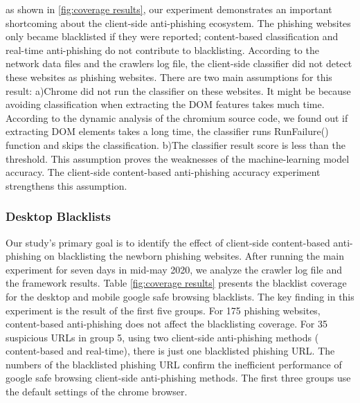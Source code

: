 as shown in \ref{fig:coverage results}, our experiment demonstrates an important shortcoming about the client-side anti-phishing ecosystem. The phishing websites only became blacklisted if they were reported; content-based classification and real-time anti-phishing do not contribute to blacklisting.
According to the network data files and the crawlers log file, the client-side classifier did not detect these websites as phishing websites. There are two main assumptions for this result:
a)Chrome did not run the classifier on these websites. It might be because avoiding classification when extracting the DOM features takes much time. According to the dynamic analysis of the chromium source code, we found out if extracting DOM elements takes a long time, the classifier runs RunFailure() function and skips the classification.
b)The classifier result score is less than the threshold. This assumption proves the weaknesses of the machine-learning model accuracy.  The client-side content-based anti-phishing accuracy experiment strengthens this assumption.

\subsubsection{Desktop Blacklists}
Our study's primary goal is to identify the effect of client-side content-based anti-phishing on blacklisting the newborn phishing websites. After running the main experiment for seven days in mid-may 2020, we analyze the crawler log file and the framework results. Table \ref{fig:coverage results} presents the blacklist coverage for the desktop and mobile google safe browsing blacklists. The key finding in this experiment is the result of the first five groups. For 175 phishing websites, content-based anti-phishing does not affect the blacklisting coverage. For  35 suspicious URLs in group 5, using two client-side anti-phishing methods ( content-based and real-time), there is just one blacklisted phishing URL. The numbers of the blacklisted phishing URL confirm the inefficient performance of google safe browsing client-side anti-phishing methods. The first three groups use the default settings of the chrome browser. 

